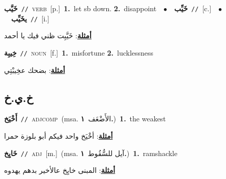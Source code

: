 \documentclass[10pt,a4paper,twoside]{article} %
\begin{document}
\begin{multicols}{2}
{\setlength\topsep{0pt}\textbf{\foreignlanguage{arabic}{خَيَّب}}\ {\color{gray}\texttt{//}\color{black}}\ \textsc{verb}\ [p.]\ \textbf{1.}~let sb down.  \textbf{2.}~disappoint\ \ $\bullet$\ \ \setlength\topsep{0pt}\textbf{\foreignlanguage{arabic}{خَيِّب}}\ {\color{gray}\texttt{//}\color{black}}\ [c.]\ \ $\bullet$\ \ \setlength\topsep{0pt}\textbf{\foreignlanguage{arabic}{يخَيِّب}}\ {\color{gray}\texttt{//}\color{black}}\ [i.]\  \begin{flushright}\color{gray}\foreignlanguage{arabic}{\textbf{\underline{\foreignlanguage{arabic}{أمثلة}}}: خَيَّبِت ظني فيك يا أحمد}\end{flushright}\color{black}} \vspace{2mm}

{\setlength\topsep{0pt}\textbf{\foreignlanguage{arabic}{خِيبِة}}\ {\color{gray}\texttt{//}\color{black}}\ \textsc{noun}\ [f.]\ \textbf{1.}~misfortune  \textbf{2.}~lucklessness\  \begin{flushright}\color{gray}\foreignlanguage{arabic}{\textbf{\underline{\foreignlanguage{arabic}{أمثلة}}}: بضحك عخِيبْتِي}\end{flushright}\color{black}} \vspace{2mm}

\vspace{-3mm}
\subsection*{\color{blue}\foreignlanguage{arabic}{خ.ي.خ}\color{blue}{}} 

{\setlength\topsep{0pt}\textbf{\foreignlanguage{arabic}{أَخْيَخ}}\ {\color{gray}\texttt{//}\color{black}}\ \textsc{adj\textunderscore comp}\ \color{gray}(msa. \foreignlanguage{arabic}{الأَضْعَف}~\foreignlanguage{arabic}{\textbf{١.}})\color{black}\ \textbf{1.}~the weakest\  \begin{flushright}\color{gray}\foreignlanguage{arabic}{\textbf{\underline{\foreignlanguage{arabic}{أمثلة}}}: أخْيَخ واحد فيكم أبو بلوزة حمرا}\end{flushright}\color{black}} \vspace{2mm}

{\setlength\topsep{0pt}\textbf{\foreignlanguage{arabic}{خَايِخ}}\ {\color{gray}\texttt{//}\color{black}}\ \textsc{adj}\ [m.]\ \color{gray}(msa. \foreignlanguage{arabic}{آيل للسُّقُوط}~\foreignlanguage{arabic}{\textbf{١.}})\color{black}\ \textbf{1.}~ramshackle\  \begin{flushright}\color{gray}\foreignlanguage{arabic}{\textbf{\underline{\foreignlanguage{arabic}{أمثلة}}}: المبنى خايِخ عالأخير بدهم يهدوه}\end{flushright}\color{black}} \vspace{2mm}


\end{multicols}
\end{document}
